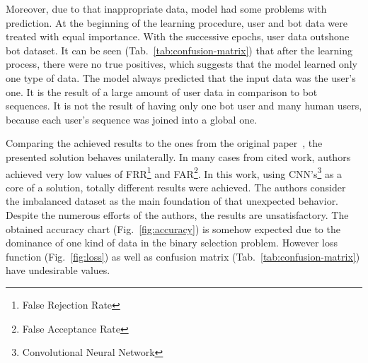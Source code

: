Moreover, due to that inappropriate data, model had some problems with prediction.
At the beginning of the learning procedure, user and bot data were treated with equal importance.
With the successive epochs, user data outshone bot dataset.
It can be seen \mbox{(Tab.~\ref{tab:confusion-matrix})} that after the learning process, there were no true positives, which suggests that the model learned only one type of data.
The model always predicted that the input data was the user's one.
It is the result of a large amount of user data in comparison to bot sequences.
It is not the result of having only one bot user and many human users, because each user's sequence was joined into a global one.

Comparing the achieved results to the ones from the original paper~\cite{Main}, the presented solution behaves unilaterally.
In many cases from cited work, authors achieved very low values of FRR\footnote{False Rejection Rate} and FAR\footnote{False Acceptance Rate}\@.
In this work, using CNN's\footnote{Convolutional Neural Network} as a core of a solution, totally different results were achieved.
The authors consider the imbalanced dataset as the main foundation of that unexpected behavior.
Despite the numerous efforts of the authors, the results are unsatisfactory.
The obtained accuracy chart (Fig.~\ref{fig:accuracy}) is somehow expected due to the dominance of one kind of data in the binary selection problem.
However loss function (Fig.~\ref{fig:loss}) as well as confusion matrix (Tab.~\ref{tab:confusion-matrix}) have undesirable values.
